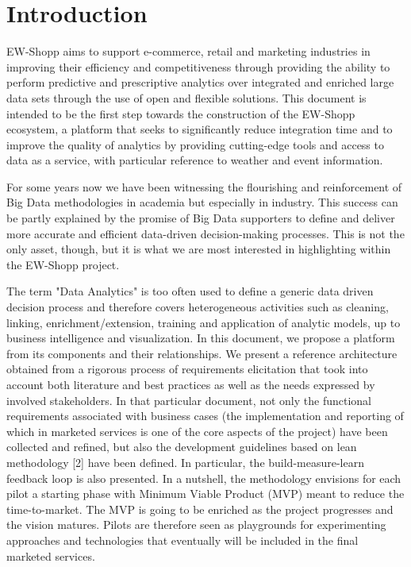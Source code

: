 \section{Introduction}

EW-Shopp aims to support e-commerce, retail and marketing industries in improving their efficiency and competitiveness through providing the ability to perform predictive and prescriptive analytics over integrated and enriched large data sets through the use of open and flexible solutions. 
This document is intended to be the first step towards the construction of the EW-Shopp ecosystem, a platform that seeks to significantly reduce integration time and to improve the quality of analytics by providing cutting-edge tools and access to data as a service, with particular reference to weather and event information.  


For some years now we have been witnessing the flourishing and reinforcement of Big Data methodologies in academia but especially in industry. 
This success can be partly explained by the promise of Big Data supporters to define and deliver more accurate and efficient data-driven decision-making processes.
This is not the only asset, though, but it is what we are most interested in highlighting within the EW-Shopp project. 

The term "Data Analytics" is too often used to define a generic data driven decision process and therefore covers heterogeneous activities such as cleaning, linking, enrichment/extension, training and application of analytic models, up to business intelligence and visualization. 
In this document, we propose a platform from its components and their relationships. We present a reference architecture obtained from a rigorous process of requirements elicitation that took into account both literature and best practices as well as the needs expressed by involved stakeholders. 
In that particular document, not only the functional requirements associated with business cases (the implementation and reporting of which in marketed services is one of the core aspects of the project) have been collected and refined, but also the development guidelines based on lean methodology [2] have been defined. In particular, the build-measure-learn feedback loop is also presented. 
In a nutshell, the methodology envisions for each pilot a starting phase with Minimum Viable Product (MVP) meant to reduce the time-to-market. The MVP is going to be enriched as the project progresses and the vision matures. Pilots are therefore seen as playgrounds for experimenting approaches and technologies that eventually will be included in the final marketed services. 


